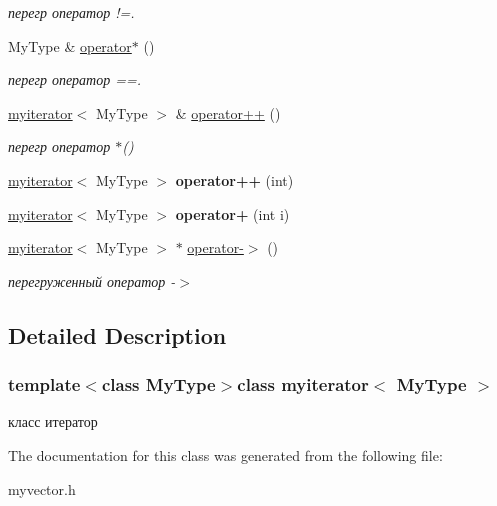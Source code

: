 \begin{DoxyCompactItemize}
\begin{DoxyCompactList}\small\item\em перегр оператор !=. \end{DoxyCompactList}\item 
\hypertarget{classmyiterator_ad5f2a0f1e70048978d0ba4a0c3596700}{}My\+Type \& \hyperlink{classmyiterator_ad5f2a0f1e70048978d0ba4a0c3596700}{operator$\ast$} ()\label{classmyiterator_ad5f2a0f1e70048978d0ba4a0c3596700}

\begin{DoxyCompactList}\small\item\em перегр оператор ==. \end{DoxyCompactList}\item 
\hypertarget{classmyiterator_a705d753d62062bed474bb55dfe519705}{}\hyperlink{classmyiterator}{myiterator}$<$ My\+Type $>$ \& \hyperlink{classmyiterator_a705d753d62062bed474bb55dfe519705}{operator++} ()\label{classmyiterator_a705d753d62062bed474bb55dfe519705}

\begin{DoxyCompactList}\small\item\em перегр оператор $\ast$() \end{DoxyCompactList}\item 
\hypertarget{classmyiterator_ad2f26a221c74bf5c6aceea6c101bc47d}{}\hyperlink{classmyiterator}{myiterator}$<$ My\+Type $>$ {\bfseries operator++} (int)\label{classmyiterator_ad2f26a221c74bf5c6aceea6c101bc47d}

\item 
\hypertarget{classmyiterator_a8d5f01a52258a18e2421979c9a5f10d8}{}\hyperlink{classmyiterator}{myiterator}$<$ My\+Type $>$ {\bfseries operator+} (int i)\label{classmyiterator_a8d5f01a52258a18e2421979c9a5f10d8}

\item 
\hypertarget{classmyiterator_acf9afabc9255e2b7009fc744700bf08f}{}\hyperlink{classmyiterator}{myiterator}$<$ My\+Type $>$ $\ast$ \hyperlink{classmyiterator_acf9afabc9255e2b7009fc744700bf08f}{operator-\/$>$} ()\label{classmyiterator_acf9afabc9255e2b7009fc744700bf08f}

\begin{DoxyCompactList}\small\item\em перегруженный оператор -\/$>$ \end{DoxyCompactList}\end{DoxyCompactItemize}


\subsection{Detailed Description}
\subsubsection*{template$<$class My\+Type$>$class myiterator$<$ My\+Type $>$}

класс итератор 

The documentation for this class was generated from the following file\+:\begin{DoxyCompactItemize}
\item 
myvector.\+h\end{DoxyCompactItemize}
